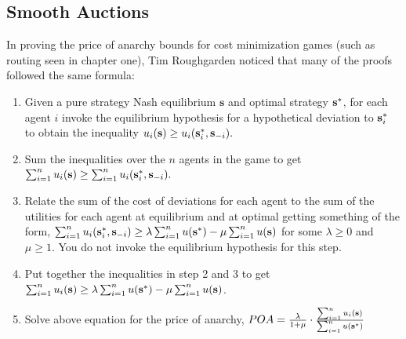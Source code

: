 \documentclass[12pt,twoside]{reedthesis}
\begin{document}
\subsection{Smooth Auctions}

In proving the price of anarchy bounds for cost minimization games (such as routing seen in chapter one), Tim Roughgarden noticed that many of the proofs followed the same formula:

\begin{enumerate}
	\item Given a pure strategy Nash equilibrium $\textbf{s}$ and optimal strategy $\textbf{s}^{*}$, for each agent $i$ invoke the equilibrium hypothesis for a hypothetical deviation to $\textbf{s}^*_i$ to obtain the inequality $u_i(\textbf{s}) \geq u_i(\textbf{s}_i^*,\textbf{s}_{-i}).$
	
	\item Sum the inequalities over the $n$ agents in the game to get $\sum_{i=1}^{n}u_i(\textbf{s}) \geq \sum_{i=1}^{n}u_i(\textbf{s}_i^*,\textbf{s}_{-i}).$
	
	
	\item Relate the sum of the cost of deviations for each agent to the sum of the utilities for each agent at equilibrium and at optimal getting something of the form, $\sum_{i=1}^{n}u_i(\textbf{s}_i^*,\textbf{s}_{-i}) \geq \lambda \sum_{i=1}^{n}u(\textbf{s}^*) - \mu \sum_{i=1}^{n}u(\textbf{s})$ for some $\lambda \geq 0$ and $\mu \geq 1$. You do not invoke the equilibrium hypothesis for this step.
	
	\item Put together the inequalities in step 2 and 3 to get $\sum_{i=1}^{n}u_i(\textbf{s}) \geq \lambda \sum_{i=1}^{n}u(\textbf{s}^*) - \mu \sum_{i=1}^{n}u(\textbf{s})$.
	
	\item Solve above equation for the price of anarchy, $POA =  \frac{\lambda}{1 + \mu} \cdot \frac{\sum_{i=1}^{n}u_i(\textbf{s})}{\sum_{i=1}^{n}u(\textbf{s}^*)}$
\end{enumerate}
\end{document}
